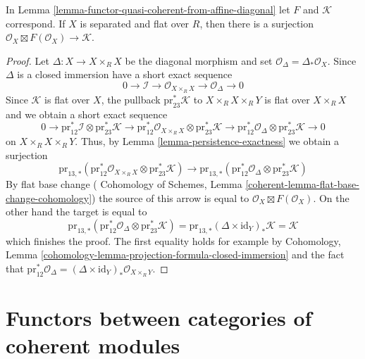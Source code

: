 \begin{lemma}
\label{lemma-functor-quasi-coherent-from-separated}
In Lemma \ref{lemma-functor-quasi-coherent-from-affine-diagonal}
let $F$ and $\mathcal{K}$ correspond. If $X$ is separated and
flat over $R$, then there is a surjection
$\mathcal{O}_X \boxtimes F(\mathcal{O}_X) \to \mathcal{K}$.
\end{lemma}

\begin{proof}
Let $\Delta : X \to X \times_R X$ be the diagonal morphism and
set $\mathcal{O}_\Delta = \Delta_*\mathcal{O}_X$.
Since $\Delta$ is a closed immersion have a short exact sequence
$$
0 \to \mathcal{I} \to 
\mathcal{O}_{X \times_R X} \to \mathcal{O}_\Delta \to 0
$$
Since $\mathcal{K}$ is flat over $X$, the pullback
$\text{pr}_{23}^*\mathcal{K}$ to $X \times_R X \times_R Y$
is flat over $X \times_R X$ and we obtain a short exact sequence
$$
0 \to 
\text{pr}_{12}^*\mathcal{I}
\otimes
\text{pr}_{23}^*\mathcal{K} \to
\text{pr}_{12}^*\mathcal{O}_{X \times_R X}
\otimes
\text{pr}_{23}^*\mathcal{K} \to
\text{pr}_{12}^*\mathcal{O}_\Delta
\otimes
\text{pr}_{23}^*\mathcal{K} \to 0
$$
on $X \times_R X \times_R Y$. Thus, by Lemma \ref{lemma-persistence-exactness}
we obtain a surjection
$$
\text{pr}_{13, *}(
\text{pr}_{12}^*\mathcal{O}_{X \times_R X}
\otimes
\text{pr}_{23}^*\mathcal{K})
\to
\text{pr}_{13, *}(
\text{pr}_{12}^*\mathcal{O}_\Delta
\otimes
\text{pr}_{23}^*\mathcal{K})
$$
By flat base change (
Cohomology of Schemes, Lemma \ref{coherent-lemma-flat-base-change-cohomology})
the source of this arrow is equal to $\mathcal{O}_X \boxtimes F(\mathcal{O}_X)$.
On the other hand the target is equal to
$$
\text{pr}_{13, *}(
\text{pr}_{12}^*\mathcal{O}_\Delta
\otimes
\text{pr}_{23}^*\mathcal{K}) =
\text{pr}_{13, *} (\Delta \times \text{id}_Y)_* \mathcal{K} =
\mathcal{K}
$$
which finishes the proof. The first equality holds for example by
Cohomology, Lemma \ref{cohomology-lemma-projection-formula-closed-immersion}
and the fact that $\text{pr}_{12}^*\mathcal{O}_\Delta =
(\Delta \times \text{id}_Y)_*\mathcal{O}_{X \times_R Y}$.
\end{proof}










\section{Functors between categories of coherent modules}
\label{section-functor-coherent}


